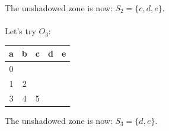 		\noindent
		The unshadowed zone is now: $S_{2} = \{c,d,e\}$.
		\\\\
		
		\newpage
		\noindent
		Let's try $O_{3}$:\\
		\begin{table}[h!]
			\begin{center}
				\begin{tabular}{|c|c|c|c|c|}
					\hline
					\cellcolor{myblue} a & 
					\cellcolor{myblue} b &
					\cellcolor{myblue} c &
					\cellcolor{bosunired!50} d &
					\cellcolor{bosunired!50} e \\
					\hline
					\cellcolor{applegreen!50} 0 &
					\multicolumn{4}{|c|}{} \\
					\hline
					\cellcolor{applegreen!50} 1 &
					\cellcolor{applegreen!50} 2 &
					\multicolumn{3}{|c|}{} \\
					\hline
					\cellcolor{applegreen!50} 3 &
					\cellcolor{applegreen!50} 4 &
					\cellcolor{applegreen!50} 5 &
					\multicolumn{2}{|c|}{} \\
					\hline
				\end{tabular}
			\end{center}
		\end{table}
		
		\noindent
		The unshadowed zone is now: $S_{3} = \{d,e\}$.
		\\\\
		
